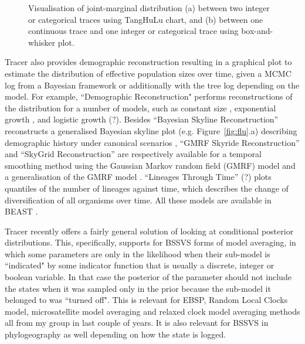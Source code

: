\documentclass{bioinfo}
\begin{document}
\begin{figure}[ht]
\caption{Visualisation of joint-marginal distribution (a) between two integer or categorical traces using TangHuLu chart, and (b) between one continuous trace and one integer or categorical trace using box-and-whisker plot.}
\label{fig:tanghulu}
\end{figure}


Tracer also provides demographic reconstruction resulting in a graphical plot to estimate the distribution of effective population sizes over time, given a MCMC log from a Bayesian framework or additionally with the tree log depending on the model.
For example, ``Demographic Reconstruction" performs reconstructions of the distribution for a number of models, such as constant size \citep{drummond2002estimating}, exponential growth \citep{drummond2002estimating}, and logistic growth (?). %
Besides ``Bayesian Skyline Reconstruction'' reconstructs a generalised Bayesian skyline plot (e.g. Figure~\ref{fig:flu}.a) describing demographic history under canonical scenarios \citep{drummond2005bayesian},
``GMRF Skyride Reconstruction'' and ``SkyGrid Reconstruction'' are respectively available for a temporal smoothing method using the Gaussian Markov random field (GMRF) model  \citep{minin2008smooth} and a generalisation of the GMRF model \citep{gill2012improving}.
``Lineages Through Time'' (?) plots quantiles of the number of lineages against time, which describes the change of diversification of all organisms over time. %
All these models are available in BEAST \citep{drummond2007beast}. 

Tracer recently offers a fairly general solution of looking at conditional posterior distributions. This, specifically, supports for BSSVS forms of model averaging, in which some parameters are only in the likelihood when their sub-model is ``indicated" by some indicator function that is usually a discrete, integer or boolean variable. In that case the posterior of the parameter should not include the states when it was sampled only in the prior because the sub-model it belonged to was ``turned off". This is relevant for EBSP, Random Local Clocks model, microsatellite model averaging and relaxed clock model averaging methods all from my group in last couple of years. It is also relevant for BSSVS in phylogeography as well depending on how the state is logged.
\end{document}
